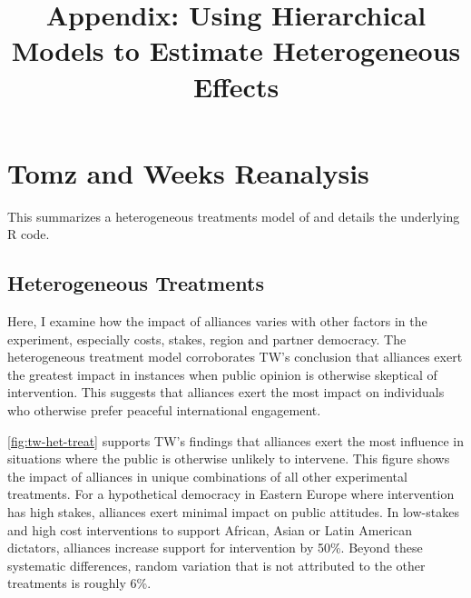 \documentclass[12pt]{article}
\title{\textbf{Appendix: Using Hierarchical Models to Estimate Heterogeneous Effects}}
\begin{document}
\maketitle 

\singlespace 

\tableofcontents



\section{Tomz and Weeks Reanalysis}

This summarizes a heterogeneous treatments model of \citep{TomzWeeks2021} and details the underlying \textsf{R} code. 

\subsection{Heterogeneous Treatments} 

Here, I examine how the impact of alliances varies with other factors in the experiment, especially costs, stakes, region and partner democracy.
The heterogeneous treatment model corroborates TW's conclusion that alliances exert the greatest impact in instances when public opinion is otherwise skeptical of intervention.
This suggests that alliances exert the most impact on individuals who otherwise prefer peaceful international engagement.  


\autoref{fig:tw-het-treat} supports TW's findings that alliances exert the most influence in situations where the public is otherwise unlikely to intervene. 
This figure shows the impact of alliances in unique combinations of all other experimental treatments. 
For a hypothetical democracy in Eastern Europe where intervention has high stakes, alliances exert minimal impact on public attitudes. 
In low-stakes and high cost interventions to support African, Asian or Latin American dictators, alliances increase support for intervention by 50\%. 
Beyond these systematic differences, random variation that is not attributed to the other treatments is roughly 6\%. 
\end{document}

